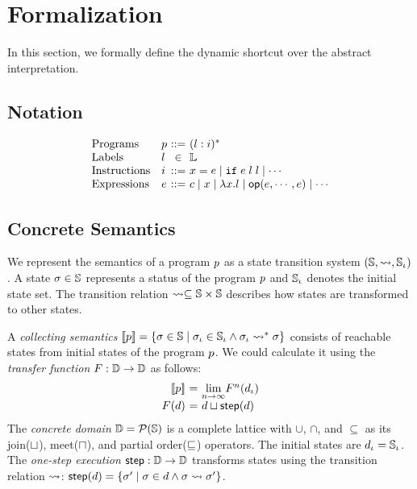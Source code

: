 \section{Formalization}

In this section, we formally define the dynamic shortcut over the abstract
interpretation.

\subsection{Notation}
\[
  \begin{array}{ll@{~}c@{~}l}
    \text{Programs} & \prog &::=& (\lab: \inst)^*\\
    \text{Labels} & \lab &\in& \labset\\
    \text{Instructions} & \inst &::=& x = \expr \mid \kwif \; \expr \; \lab \;
    \lab \mid \cdots\\
    \text{Expressions} & \expr &::=& \const \mid x \mid \lambda x. \lab \mid \op(\expr, \cdots, \expr)
    \mid \cdots\\
  \end{array}
\]


\subsection{Concrete Semantics}

We represent the semantics of a program $p$ as a state transition system
$(\mathbb{S}, \leadsto, \mathbb{S}_\iota)$.  A state $\sigma \in \mathbb{S}$ represents a status of the
program $p$ and $\mathbb{S}_\iota$ denotes the initial state set.  The transition
relation $\leadsto \subseteq \mathbb{S} \times \mathbb{S}$ describes how states are
transformed to other states.

A \textit{collecting semantics} $[\![{p}]\!] = \{ \sigma \in \mathbb{S} \mid \sigma_\iota \in
\mathbb{S}_\iota \wedge \sigma_\iota \leadsto^* \sigma \}$ consists of reachable states from initial
states of the program $p$.  We could calculate it using the \textit{transfer
function} $F: \mathbb{D} \rightarrow \mathbb{D}$ as follows:
\[
  \begin{array}{r@{~}c@{~}l}
    \sem{\prog} &=& \underset{n \rightarrow \infty}{\lim}{\transfer^n(\ielem)}\\
    \transfer(\elem) &=& \elem \join \step(\elem)\\
  \end{array}
\]
The \textit{concrete domain} $\mathbb{D} = \mathcal{P}(\mathbb{S})$ is a complete lattice
with $\cup$, $\cap$, and $\subseteq$ as its join($\sqcup$), meet($\sqcap$), and
partial order($\sqsubseteq$) operators.  The initial states are $d_\iota = \mathbb{S}_\iota$.
The \textit{one-step execution} $\textsf{step}: \mathbb{D} \rightarrow \mathbb{D}$ transforms states
using the transition relation $\leadsto$: $\textsf{step}(d) = \{ \sigma' \mid \sigma \in
d \wedge \sigma \leadsto \sigma' \}$.


